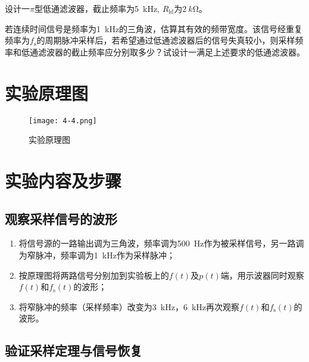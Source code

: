 \begin{Exercise}
	设计一$ \pi $型低通滤波器，截止频率为\SI{5}{kHz}, $ R_\text{ld} $为$ \SI{2}{k\ohm} $。
\end{Exercise}

\begin{Exercise}
	若连续时间信号是频率为\SI{1}{kHz}的三角波，估算其有效的频带宽度。该信号经重复频率为$ f_\text{s} $的周期脉冲采样后，若希望通过低通滤波器后的信号失真较小，则采样频率和低通滤波器的截止频率应分别取多少？试设计一满足上述要求的低通滤波器。
\end{Exercise}

\section{实验原理图}%
\label{sec:实验原理图\arabic{chapter}}

\begin{figure}[htpb]
	\centering
	\texttt{[image: 4-4.png]}
	\caption{实验原理图}
	\label{fig:实验原理图\arabic{chapter}}
\end{figure}

\section{实验内容及步骤}%
\label{sec:实验内容及步骤\arabic{chapter}}

\subsection{观察采样信号的波形}%
\label{sub:观察采样信号的波形}

\begin{enumerate}
	\item 将信号源的一路输出调为三角波，频率调为\SI{500}{Hz}作为被采样信号，另一路调为窄脉冲，频率调为\SI{1}{kHz}作为采样脉冲；
	\item 按原理图将两路信号分别加到实验板上的$ f(t) $及$ p(t) $端，用示波器同时观察$ f(t) $和$ f_\text{s}(t) $的波形；
	\item 将窄脉冲的频率（采样频率）改变为\SI{3}{kHz}，\SI{6}{kHz}再次观察$ f(t) $和$ f_\text{s}(t) $的波形。
\end{enumerate}

\subsection{验证采样定理与信号恢复}%
\label{sub:验证采样定理与信号恢复}

